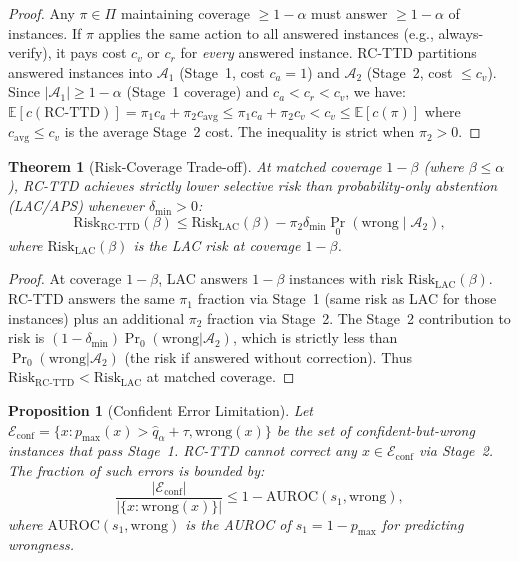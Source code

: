 \documentclass[letterpaper]{article}
\newtheorem{theorem}{Theorem}
\newtheorem{proposition}{Proposition}
\begin{document}
\begin{proof}
Any $\pi \in \Pi$ maintaining coverage $\geq 1{-}\alpha$ must answer $\geq 1{-}\alpha$ of instances. If $\pi$ applies the same action to all answered instances (e.g., always-verify), it pays cost $c_v$ or $c_r$ for \emph{every} answered instance. RC-TTD partitions answered instances into $\mathcal{A}_1$ (Stage~1, cost $c_a = 1$) and $\mathcal{A}_2$ (Stage~2, cost $\leq c_v$). Since $|\mathcal{A}_1| \geq 1{-}\alpha$ (Stage~1 coverage) and $c_a < c_r < c_v$, we have:
$\mathbb{E}[c(\text{RC-TTD})] = \pi_1 c_a + \pi_2 c_{\text{avg}} \leq \pi_1 c_a + \pi_2 c_v < c_v \leq \mathbb{E}[c(\pi)]$
where $c_{\text{avg}} \leq c_v$ is the average Stage~2 cost. The inequality is strict when $\pi_2 > 0$.
\end{proof}

\begin{theorem}[Risk-Coverage Trade-off]
\label{thm:tradeoff}
At matched coverage $1{-}\beta$ (where $\beta \leq \alpha$), RC-TTD achieves strictly lower selective risk than probability-only abstention (LAC/APS) whenever $\delta_{\min} > 0$:
\begin{equation}
\text{Risk}_{\text{RC-TTD}}(\beta) \leq \text{Risk}_{\text{LAC}}(\beta) - \pi_2 \delta_{\min} \Pr_0(\text{wrong} \mid \mathcal{A}_2),
\label{eq:tradeoff}
\end{equation}
where $\text{Risk}_{\text{LAC}}(\beta)$ is the LAC risk at coverage $1{-}\beta$.
\end{theorem}

\begin{proof}
At coverage $1{-}\beta$, LAC answers $1{-}\beta$ instances with risk $\text{Risk}_{\text{LAC}}(\beta)$. RC-TTD answers the same $\pi_1$ fraction via Stage~1 (same risk as LAC for those instances) plus an additional $\pi_2$ fraction via Stage~2. The Stage~2 contribution to risk is $(1{-}\delta_{\min})\Pr_0(\text{wrong}|\mathcal{A}_2)$, which is strictly less than $\Pr_0(\text{wrong}|\mathcal{A}_2)$ (the risk if answered without correction). Thus $\text{Risk}_{\text{RC-TTD}} < \text{Risk}_{\text{LAC}}$ at matched coverage.
\end{proof}

\begin{proposition}[Confident Error Limitation]
\label{prop:confident}
Let $\mathcal{E}_{\text{conf}} = \{x : p_{\max}(x) > \hat{q}_\alpha + \tau, \text{wrong}(x)\}$ be the set of confident-but-wrong instances that pass Stage~1. RC-TTD cannot correct any $x \in \mathcal{E}_{\text{conf}}$ via Stage~2. The fraction of such errors is bounded by:
\begin{equation}
\frac{|\mathcal{E}_{\text{conf}}|}{|\{x : \text{wrong}(x)\}|} \leq 1 - \text{AUROC}(s_1, \text{wrong}),
\label{eq:confident_bound}
\end{equation}
where $\text{AUROC}(s_1, \text{wrong})$ is the AUROC of $s_1 = 1{-}p_{\max}$ for predicting wrongness.
\end{proposition}
\end{document}
